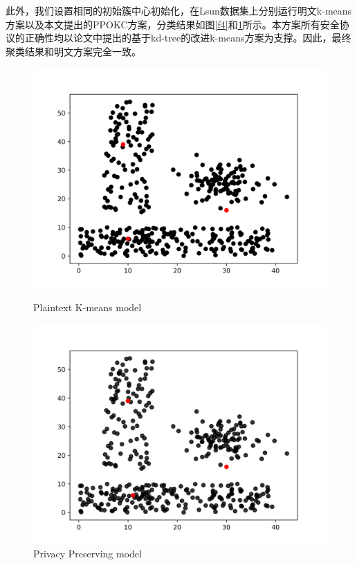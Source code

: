 此外，我们设置相同的初始簇中心初始化，在Lsun数据集上分别运行明文k-means方案以及本文提出的PPOKC方案，分类结果如图\ref{f4}和\ref{f5}所示。本方案所有安全协议的正确性均以论文\cite{kanungo2002efficient}中提出的基于kd-tree的改进k-means方案为支撑。因此，最终聚类结果和明文方案完全一致。
\begin{figure}[htbp] %
	\captionsetup{font=scriptsize}
	\begin{minipage}[t]{0.45\linewidth}
		\includegraphics[width=\linewidth]{img/lsun_ptxt.png}
		\caption{Plaintext K-means model}
		\label{f4}
	\end{minipage}%
	\hfill%
	\begin{minipage}[t]{0.45\linewidth}
		\includegraphics[width=\linewidth]{img/lsun_ctxt.png}
		\caption{Privacy Preserving model}
		\label{f5}
	\end{minipage} 
\end{figure}
